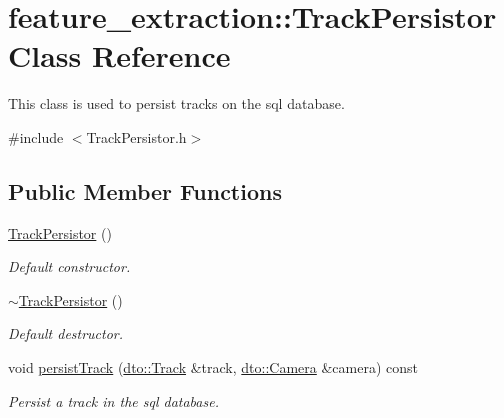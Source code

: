 \hypertarget{classfeature__extraction_1_1_track_persistor}{}\section{feature\+\_\+extraction\+:\+:Track\+Persistor Class Reference}
\label{classfeature__extraction_1_1_track_persistor}


This class is used to persist tracks on the sql database.  




{\ttfamily \#include $<$Track\+Persistor.\+h$>$}

\subsection*{Public Member Functions}
\begin{DoxyCompactItemize}
\item 
\mbox{\label{classfeature__extraction_1_1_track_persistor_abe3a4a2ea256a5b63f2c3d3c89fd1c6d}} 
\mbox{\hyperlink{classfeature__extraction_1_1_track_persistor_abe3a4a2ea256a5b63f2c3d3c89fd1c6d}{Track\+Persistor}} ()
\begin{DoxyCompactList}\small\item\em Default constructor. \end{DoxyCompactList}\item 
\mbox{\label{classfeature__extraction_1_1_track_persistor_a7312530225e24e843eeceb1cdefcaf1c}} 
\mbox{\hyperlink{classfeature__extraction_1_1_track_persistor_a7312530225e24e843eeceb1cdefcaf1c}{$\sim$\+Track\+Persistor}} ()
\begin{DoxyCompactList}\small\item\em Default destructor. \end{DoxyCompactList}\item 
\mbox{\label{classfeature__extraction_1_1_track_persistor_a635b0bc32c28938a3b17e23b97764adb}} 
void \mbox{\hyperlink{classfeature__extraction_1_1_track_persistor_a635b0bc32c28938a3b17e23b97764adb}{persist\+Track}} (\mbox{\hyperlink{structdto_1_1_track}{dto\+::\+Track}} \&track, \mbox{\hyperlink{structdto_1_1_camera}{dto\+::\+Camera}} \&camera) const
\begin{DoxyCompactList}\small\item\em Persist a track in the sql database. \end{DoxyCompactList}\end{DoxyCompactItemize}


